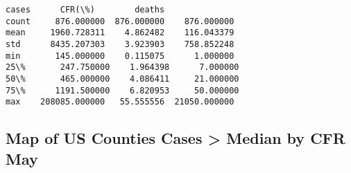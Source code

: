 \documentclass[11pt]{article}
\makeatletter
\newcommand{\boxspacing}{\kern\kvtcb@left@rule\kern\kvtcb@boxsep}
\newcommand{\prompt}[4]{
        \ttfamily\llap{{\color{#2}[#3]:\hspace{3pt}#4}}\vspace{-\baselineskip}
    }
\makeatother
\begin{document}
            \begin{tcolorbox}[breakable, size=fbox, boxrule=.5pt, pad at break*=1mm, opacityfill=0]
\prompt{Out}{outcolor}{31}{\boxspacing}
\begin{Verbatim}[commandchars=\\\{\}]
               cases      CFR(\%)        deaths
count     876.000000  876.000000    876.000000
mean     1960.728311    4.862482    116.043379
std      8435.207303    3.923903    758.852248
min       145.000000    0.115075      1.000000
25\%       247.750000    1.964398      7.000000
50\%       465.000000    4.086411     21.000000
75\%      1191.500000    6.820953     50.000000
max    208085.000000   55.555556  21050.000000
\end{Verbatim}
\end{tcolorbox}
        
    \subsection{\texorpdfstring{\textbf{Map of US Counties Cases
\textgreater{} Median by CFR
May}}{Map of US Counties Cases \textgreater{} Median by CFR May}}\label{map-of-us-counties-cases-median-by-cfr-may}
\end{document}
